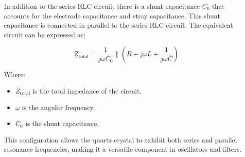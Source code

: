 In addition to the series RLC circuit, there is a shunt capacitance \( C_0 \) that accounts for the electrode capacitance and stray capacitance. This shunt capacitance is connected in parallel to the series RLC circuit. The equivalent circuit can be expressed as:

\[
Z_{\text{total}} = \frac{1}{j\omega C_0} \parallel \left( R + j\omega L + \frac{1}{j\omega C} \right)
\]

Where:
\begin{itemize}
    \item \( Z_{\text{total}} \) is the total impedance of the circuit.
    \item \( \omega \) is the angular frequency.
    \item \( C_0 \) is the shunt capacitance.
\end{itemize}

This configuration allows the quartz crystal to exhibit both series and parallel resonance frequencies, making it a versatile component in oscillators and filters.

